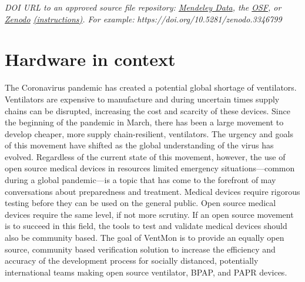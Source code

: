 \documentclass[11pt, letterpaper]{article}
\begin{document}
\begin{flushleft}
\begin{tabu}
  \textit{DOI URL to an approved source file repository:  \href{https://data.mendeley.com/}{Mendeley Data}, the \href{http://osf.io}{OSF}, or \href{https://zenodo.org/}{Zenodo} \href{https://doi.org/10.5281/zenodo.3346799}{(instructions)}. For example:} \textit{https://doi.org/10.5281/zenodo.3346799} \linebreak \linebreak
\\\hline
\end{tabu}
\end{flushleft}

\section{Hardware in context}
The Coronavirus pandemic has created a potential global shortage of ventilators\cite{pearce2020review}.
Ventilators are expensive to manufacture and during uncertain times supply chains can be disrupted,
increasing the cost and scarcity of these devices.
Since the beginning of the pandemic in March, there has been a large movement to develop cheaper, more supply chain-resilient, ventilators.
The urgency and goals of this movement have shifted as the global understanding of the virus has evolved.
Regardless of the current state of this movement, however, the use of open source medical devices in resources limited
emergency situations---common during a global pandemic---is a topic that has come to the forefront of may conversations about preparedness and treatment.
Medical devices require rigorous testing before they can be used on the general public.
Open source medical devices require the same level, if not more scrutiny. If an open source movement is to succeed in this field,
the tools to test and validate medical devices should also be community based.
The goal of VentMon is to provide an equally open source, community based verification solution to increase the efficiency and
accuracy of the development process for socially distanced, potentially international teams making open source ventilator, BPAP, and PAPR devices.
\end{document}
